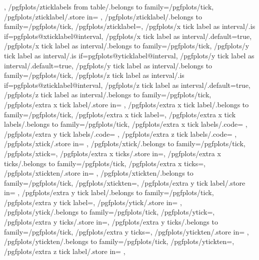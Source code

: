 {{		\to\pgfplots@zticklabels
		\let\pgfplots@zticklabel=\pgfplots@user@ticklabel@list@z
	},
	/pgfplots/zticklabels from table/.belongs to family=/pgfplots/tick,
	/pgfplots/zticklabel/.store in=	\pgfplots@zticklabel,
	/pgfplots/zticklabel/.belongs to family=/pgfplots/tick,
	/pgfplots/zticklabel=,
	/pgfplots/x tick label as interval/.is if=pgfplots@xticklabel@interval,
	/pgfplots/x tick label as interval/.default=true,
	/pgfplots/x tick label as interval/.belongs to family=/pgfplots/tick,
	/pgfplots/y tick label as interval/.is if=pgfplots@yticklabel@interval,
	/pgfplots/y tick label as interval/.default=true,
	/pgfplots/y tick label as interval/.belongs to family=/pgfplots/tick,
	/pgfplots/z tick label as interval/.is if=pgfplots@zticklabel@interval,
	/pgfplots/z tick label as interval/.default=true,
	/pgfplots/z tick label as interval/.belongs to family=/pgfplots/tick,
	/pgfplots/extra x tick label/.store in=	\pgfplots@extra@xticklabel,
	/pgfplots/extra x tick label/.belongs to family=/pgfplots/tick,
	/pgfplots/extra x tick label=,
	/pgfplots/extra x tick labels/.belongs to family=/pgfplots/tick,
	/pgfplots/extra x tick labels/.code={%
		\pgfplotslistnew{}%
		\let\pgfplots@extra@xticklabel=\pgfplots@user@extra@ticklabel@list@x
	},
	/pgfplots/extra y tick labels/.code={%
		\pgfplotslistnew{}%
		\let\pgfplots@extra@yticklabel=\pgfplots@user@extra@ticklabel@list@y
	},
	/pgfplots/extra z tick labels/.code={%
		\pgfplotslistnew{}%
		\let\pgfplots@extra@zticklabel=\pgfplots@user@extra@ticklabel@list@z
	},
	/pgfplots/xtick/.store in=			\pgfplots@xtick,
	/pgfplots/xtick/.belongs to family=/pgfplots/tick,
	/pgfplots/xtick=,
	/pgfplots/extra x ticks/.store in=\pgfplots@extra@xtick,
	/pgfplots/extra x ticks/.belongs to family=/pgfplots/tick,
	/pgfplots/extra x ticks=,
	/pgfplots/xtickten/.store in=		\pgfplots@xtickten,
	/pgfplots/xtickten/.belongs to family=/pgfplots/tick,
	/pgfplots/xtickten=,
	/pgfplots/extra y tick label/.store in=	\pgfplots@extra@yticklabel,
	/pgfplots/extra y tick label/.belongs to family=/pgfplots/tick,
	/pgfplots/extra y tick label=,
	/pgfplots/ytick/.store in=			\pgfplots@ytick,
	/pgfplots/ytick/.belongs to family=/pgfplots/tick,
	/pgfplots/ytick=,
	/pgfplots/extra y ticks/.store in=\pgfplots@extra@ytick,
	/pgfplots/extra y ticks/.belongs to family=/pgfplots/tick,
	/pgfplots/extra y ticks=,
	/pgfplots/ytickten/.store in=		\pgfplots@ytickten,
	/pgfplots/ytickten/.belongs to family=/pgfplots/tick,
	/pgfplots/ytickten=,
	/pgfplots/extra z tick label/.store in=	\pgfplots@extra@zticklabel,
}
